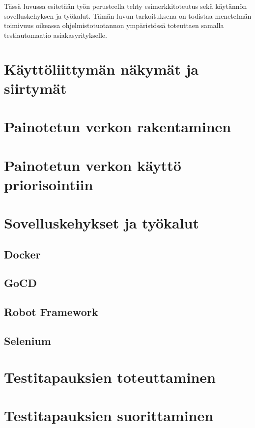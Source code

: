 Tässä luvussa esitetään työn perusteella tehty esimerkkitoteutus sekä käytännön sovelluskehyksen ja työkalut.
Tämän luvun tarkoituksena on todistaa menetelmän toimivuus oikeassa ohjelmistotuotannon ympäristössä toteuttaen samalla testiautomaatio asiakasyritykselle.

\section{Käyttöliittymän näkymät ja siirtymät}


\section{Painotetun verkon rakentaminen}


\section{Painotetun verkon käyttö priorisointiin}


\section{Sovelluskehykset ja työkalut}


  \subsection{Docker}


  \subsection{GoCD}


  \subsection{Robot Framework}


  \subsection{Selenium}


\section{Testitapauksien toteuttaminen}


\section{Testitapauksien suorittaminen}

